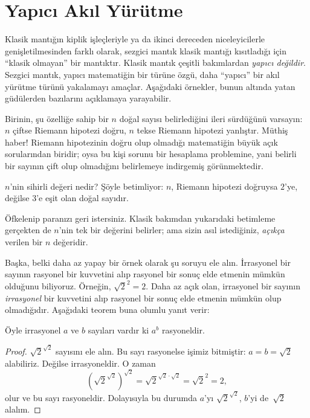 \documentclass[../../../include/open-logic-chapter]{subfiles}
\begin{document}

\section{Yapıcı Akıl Yürütme}

Klasik mantığın kiplik işleçleriyle ya da ikinci dereceden niceleyicilerle
genişletilmesinden farklı olarak, sezgici mantık klasik mantığı kısıtladığı için
``klasik olmayan'' bir mantıktır. Klasik mantık çeşitli bakımlardan
\emph{yapıcı değildir}. Sezgici mantık, yapıcı matematiğin bir türüne özgü,
daha ``yapıcı'' bir akıl yürütme türünü yakalamayı amaçlar. Aşağıdaki örnekler,
bunun altında yatan güdülerden bazılarını açıklamaya yarayabilir.

Birinin, şu özelliğe sahip bir $n$ doğal sayısı belirlediğini ileri sürdüğünü
varsayın: $n$ çiftse Riemann hipotezi doğru, $n$ tekse Riemann hipotezi
yanlıştır. Müthiş haber!{} Riemann hipotezinin doğru olup olmadığı matematiğin
büyük açık sorularından biridir; oysa bu kişi sorunu bir hesaplama problemine,
yani belirli bir sayının çift olup olmadığını belirlemeye indirgemiş
görünmektedir.

$n$'nin sihirli değeri nedir? Şöyle betimliyor: $n$, Riemann hipotezi doğruysa
$2$'ye, değilse $3$'e eşit olan doğal sayıdır.

Öfkelenip paranızı geri istersiniz. Klasik bakımdan yukarıdaki betimleme
gerçekten de $n$'nin tek bir değerini belirler; ama sizin asıl istediğiniz,
\emph{açıkça} verilen bir $n$ değeridir.

Başka, belki daha az yapay bir örnek olarak şu soruyu ele alın. İrrasyonel bir
sayının rasyonel bir kuvvetini alıp rasyonel bir sonuç elde etmenin mümkün
olduğunu biliyoruz. Örneğin, $\sqrt{2}^2 = 2$. Daha az açık olan, irrasyonel bir
sayının \emph{irrasyonel} bir kuvvetini alıp rasyonel bir sonuç elde etmenin
mümkün olup olmadığıdır. Aşağıdaki teorem buna olumlu yanıt verir:

\begin{thm}
Öyle irrasyonel $a$ ve $b$ sayıları vardır ki $a^b$ rasyoneldir.
\end{thm}

\begin{proof}
$\sqrt{2}^{\sqrt{2}}$ sayısını ele alın. Bu sayı rasyonelse işimiz bitmiştir:
$a = b = \sqrt{2}$ alabiliriz. Değilse irrasyoneldir. O zaman
\[
(\sqrt{2}^{\sqrt{2}})^{\sqrt{2}} = \sqrt{2}^{\sqrt{2} \cdot
  \sqrt{2}} = \sqrt{2}^2 = 2,
\]
olur ve bu sayı rasyoneldir. Dolayısıyla bu durumda $a$'yı
$\sqrt{2}^{\sqrt{2}}$, $b$'yi de~$\sqrt 2$ alalım.
\end{proof}
\end{document}

